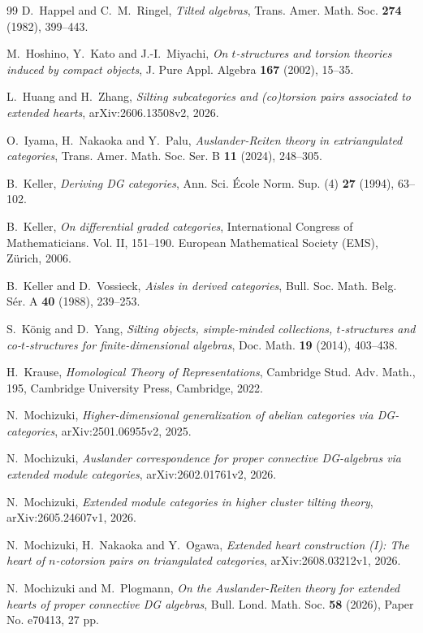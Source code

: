\documentclass[11pt,a4paper,reqno]{amsart}
\theoremstyle{plain}
\numberwithin{equation}{section}
\theoremstyle{definition}
\begin{document}
\begin{thebibliography}{99}
D.~Happel and C.~M.~Ringel,
\emph{Tilted algebras},
Trans. Amer. Math. Soc. \textbf{274} (1982), 399--443.

M.~Hoshino, Y.~Kato and J.-I.~Miyachi,
\emph{On $t$-structures and torsion theories induced by compact objects},
J. Pure Appl. Algebra \textbf{167} (2002), 15--35.

L.~Huang and H.~Zhang,
\emph{Silting subcategories and (co)torsion pairs associated to extended hearts},
arXiv:2606.13508v2, 2026.

O.~Iyama, H.~Nakaoka and Y.~Palu,
\emph{Auslander-Reiten theory in extriangulated categories},
Trans. Amer. Math. Soc. Ser. B \textbf{11} (2024), 248--305.

B.~Keller,
\emph{Deriving DG categories},
Ann. Sci. \'{E}cole Norm. Sup. (4) \textbf{27} (1994), 63--102.

B.~Keller,
\emph{On differential graded categories},
International Congress of Mathematicians. Vol. II, 151--190. European Mathematical Society (EMS), Z\"{u}rich, 2006.

B.~Keller and D.~Vossieck,
\emph{Aisles in derived categories},
Bull. Soc. Math. Belg. S\'{e}r. A \textbf{40} (1988), 239--253.

S.~K\"onig and D.~Yang,
\emph{Silting objects, simple-minded collections, $t$-structures and co-$t$-structures for finite-dimensional algebras},
Doc. Math. \textbf{19} (2014), 403--438.

H.~Krause,
\emph{Homological Theory of Representations},
Cambridge Stud. Adv. Math., 195, Cambridge University Press, Cambridge, 2022.

N.~Mochizuki,
\emph{Higher-dimensional generalization of abelian categories via DG-categories},
arXiv:2501.06955v2, 2025.

N.~Mochizuki,
\emph{Auslander correspondence for proper connective DG-algebras via extended module categories},
arXiv:2602.01761v2, 2026.

N.~Mochizuki,
\emph{Extended module categories in higher cluster tilting theory},
arXiv:\allowbreak2605.24607v1, 2026.

N.~Mochizuki, H.~Nakaoka and Y.~Ogawa,
\emph{Extended heart construction (I): The heart of $n$-cotorsion pairs on triangulated categories},
arXiv:2608.03212v1, 2026.

N.~Mochizuki and M.~Plogmann,
\emph{On the Auslander-Reiten theory for extended hearts of proper connective DG algebras},
Bull. Lond. Math. Soc. \textbf{58} (2026), Paper No. e70413, 27 pp.


\end{thebibliography}
\end{document}
